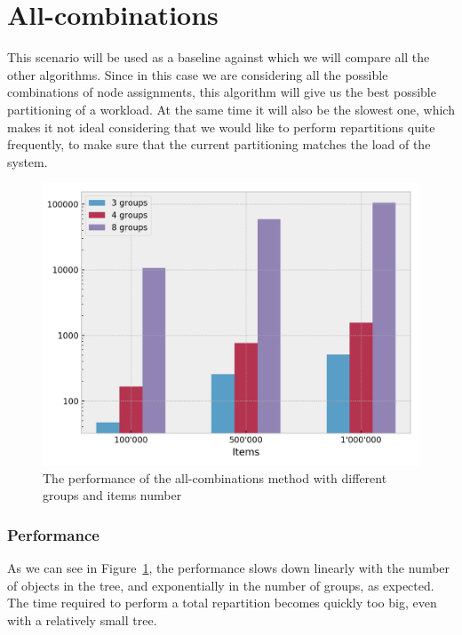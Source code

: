 
\section{All-combinations}\label{sec:All-combinations}
This scenario will be used as a baseline against which we will compare all the other algorithms. Since in this case we are considering all the possible combinations of node assignments, this algorithm will give us the best possible partitioning of a workload. At the same time it will also be the slowest one, which makes it not ideal considering that we would like to perform repartitions quite frequently, to make sure that the current partitioning matches the load of the system.

\begin{figure}[!htb]
  \centering
  \includegraphics[width=\textwidth,height=\textheight,keepaspectratio]{img/all.png}
  \caption{The performance of the all-combinations method with different groups and items number}
  \label{fig:all}
\end{figure}

\subsubsection{Performance}
As we can see in Figure~\ref{fig:all}, the performance slows down linearly with the number of objects in the tree, and exponentially in the number of groups, as expected. The time required to perform a total repartition becomes quickly too big, even with a relatively small tree.

